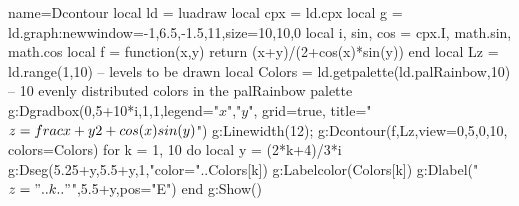 \begin{luadraw}{name=Dcontour}
local ld = luadraw
local cpx = ld.cpx
local g = ld.graph:new{window={-1,6.5,-1.5,11},size={10,10,0}}
local i, sin, cos = cpx.I, math.sin, math.cos
local f = function(x,y) return (x+y)/(2+cos(x)*sin(y)) end
local Lz = ld.range(1,10) -- levels to be drawn
local Colors = ld.getpalette(ld.palRainbow,10) -- 10 evenly distributed colors in the palRainbow palette
g:Dgradbox({0,5+10*i,1,1},{legend={"$x$","$y$"}, grid=true, title="$z=\\frac{x+y}{2+\\cos(x)\\sin(y)}$"})
g:Linewidth(12); g:Dcontour(f,Lz,{view={0,5,0,10}, colors=Colors})
for k = 1, 10 do
    local y = (2*k+4)/3*i
    g:Dseg({5.25+y,5.5+y},1,"color="..Colors[k])
    g:Labelcolor(Colors[k])
    g:Dlabel("$z="..k.."$",5.5+y,{pos="E"})
end
g:Show()
\end{luadraw}
